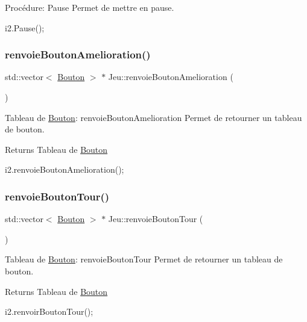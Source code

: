 Procédure\+: Pause Permet de mettre en pause. 


\begin{DoxyCode}
i2.Pause();
\end{DoxyCode}
 \mbox{\label{classJeu_a09404fb1bfd86af39da4cb5945f22fa5}} 
\subsubsection{\texorpdfstring{renvoie\+Bouton\+Amelioration()}{renvoieBoutonAmelioration()}}
{\footnotesize\ttfamily std\+::vector$<$ \hyperlink{classBouton}{Bouton} $>$ $\ast$ Jeu\+::renvoie\+Bouton\+Amelioration (\begin{DoxyParamCaption}{ }\end{DoxyParamCaption})}



Tableau de \hyperlink{classBouton}{Bouton}\+: renvoie\+Bouton\+Amelioration Permet de retourner un tableau de bouton. 

\begin{DoxyReturn}{Returns}
Tableau de \hyperlink{classBouton}{Bouton} 
\begin{DoxyCode}
i2.renvoieBoutonAmelioration();
\end{DoxyCode}
 
\end{DoxyReturn}
\mbox{\label{classJeu_aea4394fb2f268e68eb8118d32286e8d7}} 
\subsubsection{\texorpdfstring{renvoie\+Bouton\+Tour()}{renvoieBoutonTour()}}
{\footnotesize\ttfamily std\+::vector$<$ \hyperlink{classBouton}{Bouton} $>$ $\ast$ Jeu\+::renvoie\+Bouton\+Tour (\begin{DoxyParamCaption}{ }\end{DoxyParamCaption})}



Tableau de \hyperlink{classBouton}{Bouton}\+: renvoie\+Bouton\+Tour Permet de retourner un tableau de bouton. 

\begin{DoxyReturn}{Returns}
Tableau de \hyperlink{classBouton}{Bouton} 
\begin{DoxyCode}
i2.renvoirBoutonTour();
\end{DoxyCode}
 
\end{DoxyReturn}
\mbox{\label{classJeu_a495360d61991b02b3a5a702cef5bd4b2}} 
